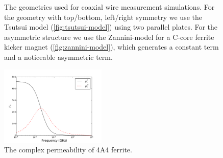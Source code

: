 \begin{figure}
\caption{The geometries used for coaxial wire measurement simulations. For the geometry with top/bottom, left/right symmetry we use the Tsutsui model (\ref{fig:tsutsui-model}) using two parallel plates. For the asymmetric structure we use the Zannini-model for a C-core ferrite kicker magnet (\ref{fig:zannini-model}), which generates a constant term and a noticeable asymmetric term.}
\label{fig:wire-measure-geometries}
\end{figure}

\begin{figure}
\begin{center}
\includegraphics[width=0.45\textwidth]{Bench_Top_Measurements/figures/4A4FerrMu.pdf}
\end{center}
\caption{The complex permeability of 4A4 ferrite.}
\label{fig:4a4permeability}
\end{figure}

